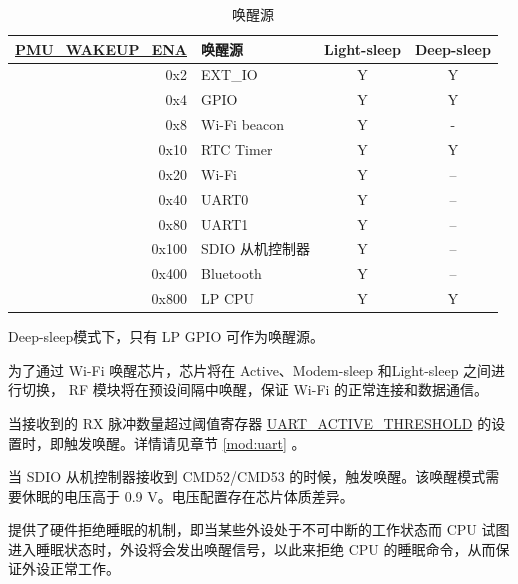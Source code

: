 \documentclass[main\_\_CN.tex]{subfiles}
\begin{document}
\begin{table}[H]
    \centering
    \caption{唤醒源}
    \label{tab:lowpowm-wakeup-source}
    \begin{threeparttable}
    \begin{tabular}{| r | l | c | c |}
    \hline
    \rowcolor{lightgray}
    \textbf{\hyperref[fielddesc:PMUWAKEUPENA]{PMU\_WAKEUP\_ENA}} & \textbf{唤醒源} &  \textbf{Light-sleep} & \textbf{Deep-sleep}  \\\hline
    0x2 & EXT\_IO\tnote{1} & Y & Y \\\hline
    0x4 & GPIO\tnote{1} & Y & Y \\\hline
    0x8 & Wi-Fi beacon  & Y & - \\\hline
    0x10 & RTC Timer  & Y & Y \\\hline
    0x20 & Wi-Fi\tnote{2} & Y & – \\\hline
    0x40 & UART0\tnote{3} & Y & – \\\hline
    0x80 & UART1\tnote{3} & Y & – \\\hline
    0x100 & SDIO 从机控制器\tnote{4} & Y & – \\\hline
    0x400 & Bluetooth & Y & – \\\hline
    0x800 & LP CPU  & Y & Y \\\hline
    \end{tabular}

\begin{tablenotes}
    \item[1] Deep-sleep模式下，只有 LP GPIO 可作为唤醒源。

    \item[2] 为了通过 Wi-Fi 唤醒芯片，芯片将在 Active、Modem-sleep 和Light-sleep 之间进行切换， RF 模块将在预设间隔中唤醒，保证 Wi-Fi 的正常连接和数据通信。

    \item[3] 当接收到的 RX 脉冲数量超过阈值寄存器 \hyperref[fielddesc:UARTACTIVETHRESHOLD]{UART\_ACTIVE\_THRESHOLD} 的设置时，即触发唤醒。详情请见章节 \ref{mod:uart} \textit{}。
    \item[4] 当 SDIO 从机控制器接收到 CMD52/CMD53 的时候，触发唤醒。该唤醒模式需要休眠的电压高于 0.9 V。电压配置存在芯片体质差异。
    \end{tablenotes}
    \end{threeparttable}
\end{table}

\chipname{} 提供了硬件拒绝睡眠的机制，即当某些外设处于不可中断的工作状态而 CPU 试图进入睡眠状态时，外设将会发出唤醒信号，以此来拒绝 CPU 的睡眠命令，从而保证外设正常工作。
\end{document}
